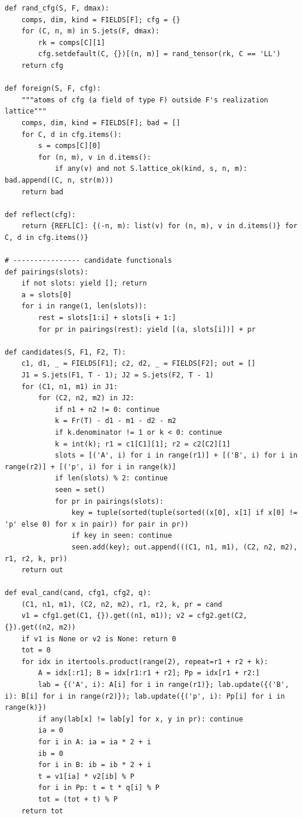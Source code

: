 \documentclass[10pt]{article}
\begin{document}
\begin{lstlisting}
def rand_cfg(S, F, dmax):
    comps, dim, kind = FIELDS[F]; cfg = {}
    for (C, n, m) in S.jets(F, dmax):
        rk = comps[C][1]
        cfg.setdefault(C, {})[(n, m)] = rand_tensor(rk, C == 'LL')
    return cfg

def foreign(S, F, cfg):
    """atoms of cfg (a field of type F) outside F's realization lattice"""
    comps, dim, kind = FIELDS[F]; bad = []
    for C, d in cfg.items():
        s = comps[C][0]
        for (n, m), v in d.items():
            if any(v) and not S.lattice_ok(kind, s, n, m): bad.append((C, n, str(m)))
    return bad

def reflect(cfg):
    return {REFL[C]: {(-n, m): list(v) for (n, m), v in d.items()} for C, d in cfg.items()}

# ---------------- candidate functionals
def pairings(slots):
    if not slots: yield []; return
    a = slots[0]
    for i in range(1, len(slots)):
        rest = slots[1:i] + slots[i + 1:]
        for pr in pairings(rest): yield [(a, slots[i])] + pr

def candidates(S, F1, F2, T):
    c1, d1, _ = FIELDS[F1]; c2, d2, _ = FIELDS[F2]; out = []
    J1 = S.jets(F1, T - 1); J2 = S.jets(F2, T - 1)
    for (C1, n1, m1) in J1:
        for (C2, n2, m2) in J2:
            if n1 + n2 != 0: continue
            k = Fr(T) - d1 - m1 - d2 - m2
            if k.denominator != 1 or k < 0: continue
            k = int(k); r1 = c1[C1][1]; r2 = c2[C2][1]
            slots = [('A', i) for i in range(r1)] + [('B', i) for i in range(r2)] + [('p', i) for i in range(k)]
            if len(slots) % 2: continue
            seen = set()
            for pr in pairings(slots):
                key = tuple(sorted(tuple(sorted((x[0], x[1] if x[0] != 'p' else 0) for x in pair)) for pair in pr))
                if key in seen: continue
                seen.add(key); out.append(((C1, n1, m1), (C2, n2, m2), r1, r2, k, pr))
    return out

def eval_cand(cand, cfg1, cfg2, q):
    (C1, n1, m1), (C2, n2, m2), r1, r2, k, pr = cand
    v1 = cfg1.get(C1, {}).get((n1, m1)); v2 = cfg2.get(C2, {}).get((n2, m2))
    if v1 is None or v2 is None: return 0
    tot = 0
    for idx in itertools.product(range(2), repeat=r1 + r2 + k):
        A = idx[:r1]; B = idx[r1:r1 + r2]; Pp = idx[r1 + r2:]
        lab = {('A', i): A[i] for i in range(r1)}; lab.update({('B', i): B[i] for i in range(r2)}); lab.update({('p', i): Pp[i] for i in range(k)})
        if any(lab[x] != lab[y] for x, y in pr): continue
        ia = 0
        for i in A: ia = ia * 2 + i
        ib = 0
        for i in B: ib = ib * 2 + i
        t = v1[ia] * v2[ib] % P
        for i in Pp: t = t * q[i] % P
        tot = (tot + t) % P
    return tot


\end{lstlisting}
\end{document}
